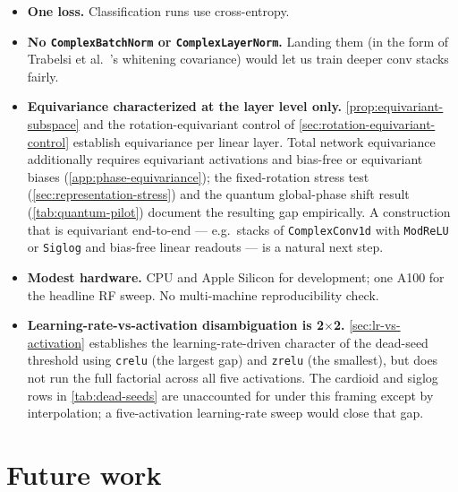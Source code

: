 \documentclass{article}
\providecommand{\Cref}[1]{\autoref{#1}}
\newcommand{\code}[1]{\texttt{#1}}
\begin{document}
\begin{itemize}
    separately.
  \item \textbf{One loss.} Classification runs use cross-entropy.
  \item \textbf{No \code{ComplexBatchNorm} or \code{ComplexLayerNorm}.}
    Landing them (in the form of Trabelsi et
    al.~\cite{trabelsi2018deep}'s whitening covariance) would let us
    train deeper conv stacks fairly.
  \item \textbf{Equivariance characterized at the layer level only.}
    \Cref{prop:equivariant-subspace} and the rotation-equivariant
    control of \Cref{sec:rotation-equivariant-control} establish
    equivariance per linear layer. Total network equivariance
    additionally requires equivariant activations and bias-free or
    equivariant biases (\Cref{app:phase-equivariance}); the
    fixed-rotation stress test (\Cref{sec:representation-stress})
    and the quantum global-phase shift result
    (\Cref{tab:quantum-pilot}) document the resulting gap empirically.
    A construction that is equivariant end-to-end --- e.g.\ stacks of
    \code{ComplexConv1d} with \code{ModReLU} or \code{Siglog} and
    bias-free linear readouts --- is a natural next step.
  \item \textbf{Modest hardware.} CPU and Apple Silicon for
    development; one A100 for the headline RF sweep. No
    multi-machine reproducibility check.
  \item \textbf{Learning-rate-vs-activation disambiguation is 2$\times$2.}
    \Cref{sec:lr-vs-activation} establishes the learning-rate-driven character
    of the dead-seed threshold using \code{crelu} (the largest gap)
    and \code{zrelu} (the smallest), but does not run the full
    factorial across all five activations. The cardioid and siglog
    rows in \Cref{tab:dead-seeds} are unaccounted for under this
    framing except by interpolation; a five-activation learning-rate sweep
    would close that gap.
\end{itemize}

\section{Future work}
\label{sec:future-work}
\end{document}
